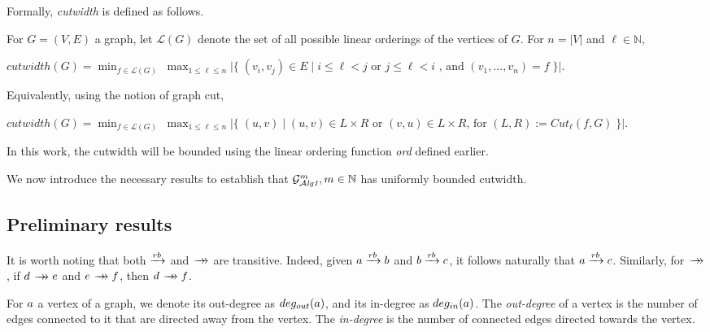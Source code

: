 \documentclass[12pt]{article}
\begin{document}
Formally, \textsl{cutwidth} is defined as follows.

\begin{nameddefinition}[Cutwidth]


For $G=(V,E)$ a graph, let $\mathscr{L}(G)$ denote the set of all possible linear orderings of the vertices of $G$. For $n=|V|$ and $\ell\in\mathbb{N}$,

\begin{center}
$cutwidth(G)=\displaystyle \min_{f\in \mathscr{L}(G)}\; \max_{1\leq\ell\leq n} \big|\big\{\;(v_i,v_j) \in E\;\big|\; i\leq\ell<j \text{ or }j\leq\ell<i \text{ , and } (v_1,...,v_n)=f \;\big\}\big|$.
\end{center}

Equivalently, using the notion of graph cut,

\begin{center}
$cutwidth(G)=\displaystyle \min_{f\in \mathscr{L}(G)}\; \max_{1\leq\ell\leq n} \big|\big\{\;
(u,v)\;\big| \; (u,v)\in L\times R\text{ or }(v,u)\in L\times R \text{, for }(L,R):=Cut_\ell(f,G)
\;\big\}\big|$.
\end{center}

\end{nameddefinition}

\vspace{1em}

In this work, the cutwidth will be bounded using the linear ordering function  \textsl{ord} defined earlier.

We now introduce the necessary results to establish that $\mathcal{G}_{\mathcal{A}\emph{lg1}}^m,m\in\mathbb{N}$ has uniformly bounded cutwidth.

\subsection{Preliminary results}

It is worth noting that both $\xrightarrow{rb}$ and $\patharrow$ are transitive. Indeed, given $a \xrightarrow{rb} b$ and $b \xrightarrow{rb} c$,   it follows naturally that $a\xrightarrow{rb}c$. Similarly, for  $\patharrow$, if $\opd \patharrow \ope$ and $\ope \patharrow \opf$, then $\opd \patharrow \opf$.

\vspace{1em}

For $a$ a vertex of a graph, we denote its out-degree as $deg_{out}(a)$, and its in-degree as $deg_{in}(a)$. The \textsl{out-degree} of a vertex is the number of edges connected to it that are directed away from the vertex. The \textsl{in-degree} is the number of connected edges directed towards the vertex.
\end{document}
